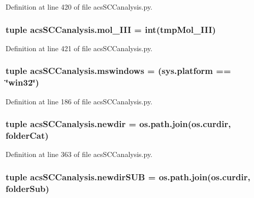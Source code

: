 Definition at line 420 of file acs\-S\-C\-Canalysis.\-py.

\hypertarget{a00097_a20047e8516f386a7e98ffa0efec09471}{
\subsubsection[{mol\-\_\-\-I\-I\-I}]{\setlength{\rightskip}{0pt plus 5cm}tuple acs\-S\-C\-Canalysis.\-mol\-\_\-\-I\-I\-I = int(tmp\-Mol\-\_\-\-I\-I\-I)}}\label{a00097_a20047e8516f386a7e98ffa0efec09471}


Definition at line 421 of file acs\-S\-C\-Canalysis.\-py.

\hypertarget{a00097_a2abf09620dd1dd990036c67c626b3dee}{
\subsubsection[{mswindows}]{\setlength{\rightskip}{0pt plus 5cm}tuple acs\-S\-C\-Canalysis.\-mswindows = (sys.\-platform == \char`\"{}win32\char`\"{})}}\label{a00097_a2abf09620dd1dd990036c67c626b3dee}


Definition at line 186 of file acs\-S\-C\-Canalysis.\-py.

\hypertarget{a00097_a440179ca1c764cabcf9181985ae5dfb8}{
\subsubsection[{newdir}]{\setlength{\rightskip}{0pt plus 5cm}tuple acs\-S\-C\-Canalysis.\-newdir = os.\-path.\-join(os.\-curdir, {\bf folder\-Cat})}}\label{a00097_a440179ca1c764cabcf9181985ae5dfb8}


Definition at line 363 of file acs\-S\-C\-Canalysis.\-py.

\hypertarget{a00097_adb3b62d0896774bc87adfee19d047aa8}{
\subsubsection[{newdir\-S\-U\-B}]{\setlength{\rightskip}{0pt plus 5cm}tuple acs\-S\-C\-Canalysis.\-newdir\-S\-U\-B = os.\-path.\-join(os.\-curdir, {\bf folder\-Sub})}}\label{a00097_adb3b62d0896774bc87adfee19d047aa8}


